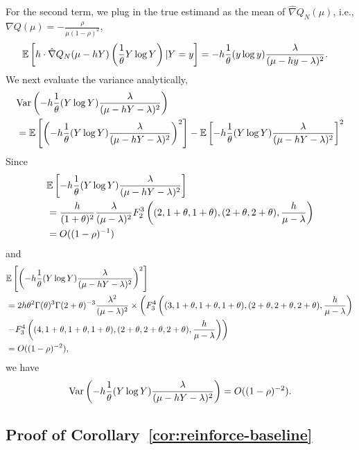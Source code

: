 For the second term, we plug in the true estimand as the mean of $\hat{\nabla} Q_{N}(\mu)$, i.e., $ \nabla Q(\mu) = -\frac{\rho}{\mu(1-\rho)^{2}}$,
\begin{align*}
&\mathbb{E}\left[h \cdot \hat{\nabla} Q_{N}(\mu - h Y) \left( \frac{1}{\theta} Y \log Y \right)|Y = y\right] 
= - h\frac{1}{\theta} (y \log y) \frac{\lambda }{(\mu - hy - \lambda)^{2}}.
\end{align*}
We next evaluate the variance analytically,
\begin{align*}
&{\rm Var}\left(
- h\frac{1}{\theta} (Y \log Y) \frac{\lambda }{(\mu - hY - \lambda)^{2}}
\right) \\
&= 
\mathbb{E}\left[ 
\left(- h\frac{1}{\theta} (Y \log Y) \frac{\lambda }{(\mu - hY - \lambda)^{2}}
\right)^{2}
\right] 
- \mathbb{E}\left[ 
- h\frac{1}{\theta} (Y \log Y) \frac{\lambda }{(\mu - hY - \lambda)^{2}}
\right]^{2}
\end{align*}
Since
\begin{align*}
&\mathbb{E}\left[ 
- h\frac{1}{\theta} (Y \log Y) \frac{\lambda }{(\mu - hY - \lambda)^{2}}
\right] \\
&= \frac{h}{(1+\theta)^{2}}
\frac{\lambda}{(\mu - \lambda)^{2}}
F^{3}_{2} 
\left((2,1+\theta,1+\theta), 
(2+\theta, 2+ \theta), \frac{h}{\mu -\lambda} \right) \\
& = O((1-\rho)^{-1})
\end{align*}
and
\begin{align*}
&\mathbb{E}\left[ 
\left(- h\frac{1}{\theta} (Y \log Y) \frac{\lambda }{(\mu - hY - \lambda)^{2}}
\right)^{2}
\right] \\
&=
2h\theta^{2}\Gamma(\theta)^{3}\Gamma(2+\theta)^{-3}\frac{\lambda^{2}}{(\mu - \lambda)^{2}} \times 
\left( F^{4}_{3} 
\left((3,1+\theta,1+\theta,1+\theta), 
(2+\theta, 2+ \theta,2+ \theta), \frac{h}{\mu -\lambda} \right) \right. \\
& \left. -F^{4}_{3} 
\left((4,1+\theta,1+\theta,1+\theta), 
(2+\theta, 2+ \theta,2+ \theta), \frac{h}{\mu -\lambda} \right) \right) \\
& = O((1-\rho)^{-2}),
\end{align*}
we have
\[
{\rm Var}\left(
- h\frac{1}{\theta} (Y \log Y) \frac{\lambda }{(\mu - hY - \lambda)^{2}}
\right) = O( (1-\rho)^{-2}).
\]


\subsection{Proof of Corollary~\ref{cor:reinforce-baseline}}
\label{sec:proof_reinforce_baseline}

